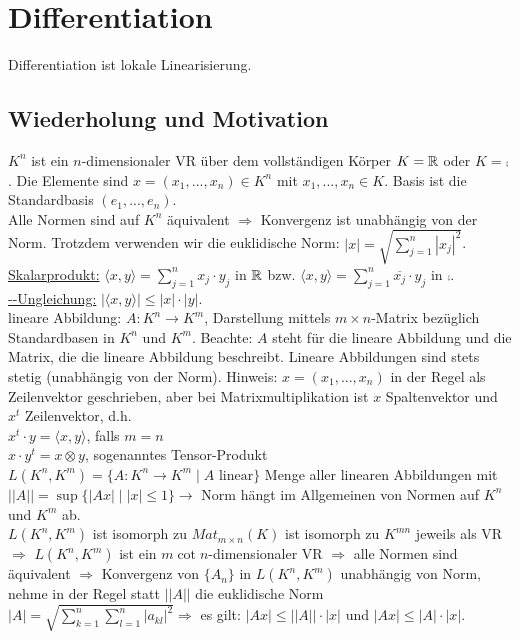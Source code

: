 \setcounter{dummy}{16}
\addtocounter{section}{15}
\addtocounter{chapter}{4}

\chapter{Differentiation}
	Differentiation ist lokale Linearisierung.

\section{Wiederholung und Motivation}
	\begin{ueberblick}
	$K^n$ ist ein $n$-dimensionaler VR über dem vollständigen Körper $K=\mathbb{R}$ 
	oder $K=\comp$. Die Elemente sind $x=(x_1,...,x_n)\in K^n$ mit 
	$x_1,...,x_n\in K$. Basis ist die Standardbasis $(e_1,...,e_n)$. \\
	
	
	Alle Normen sind auf $K^n$ äquivalent $\Rightarrow$ Konvergenz ist 
	unabhängig von der Norm. Trotzdem verwenden wir die euklidische Norm: 
	$|x|=\sqrt{\sum\limits_{j=1}^n |x_j|^2}$. \\
	
	
	\underline{Skalarprodukt:} $\langle x,y \rangle=\sum\limits_{j=1}^n x_j\cdot y_j$ in 
	$\mathbb{R}$ bzw. $\langle x,y \rangle=\sum\limits_{j=1}^n \overline{x_j}
	\cdot y_j$ in $\comp$. \\
	
	
	\underline{--Ungleichung:} $|\langle x,y \rangle| \le
	|x|\cdot |y|$. \\

	
	lineare Abbildung: $A:K^n \to K^m$, Darstellung mittels $m\times n$-Matrix 
	bezüglich Standardbasen in $K^n$ und $K^m$. Beachte: $A$ steht für die 
	lineare Abbildung und die Matrix, die die lineare Abbildung beschreibt. 
	Lineare Abbildungen sind stets stetig (unabhängig von der Norm). Hinweis: 
	$x=(x_1,...,x_n)$ in der Regel als Zeilenvektor geschrieben, aber bei 
	Matrixmultiplikation ist $x$ Spaltenvektor und $x^t$ Zeilenvektor, d.h. \\
	$x^t\cdot y=\langle x,y \rangle$, falls $m=n$ \\
	$x\cdot y^t=x\otimes y$, sogenanntes Tensor-Produkt \\
	
	
	$L(K^n,K^m)=\{A: K^n \to K^m \mid A \text{ linear}\}$ Menge aller 
	linearen Abbildungen mit $||A||=\sup\{|Ax| \mid |x|\le 1\} \to$ Norm 
	hängt im Allgemeinen von Normen auf $K^n$ und $K^m$ ab. \\
	$L(K^n,K^m)$ ist isomorph zu $Mat_{m\times n}(K)$ ist isomorph zu $K^{mn}$ 
	jeweils als VR $\Rightarrow$ $L(K^n,K^m)$ ist ein $m\cot n$-dimensionaler 
	VR $\Rightarrow$ alle Normen sind äquivalent $\Rightarrow$ Konvergenz von 
	$\{A_n\}$ in $L(K^n,K^m)$ unabhängig von Norm, nehme in der Regel statt 
	$||A||$ die euklidische Norm $|A|=\sqrt{\sum\limits_{k=1}^n \sum\limits_
	{l=1}^n |a_{kl}|^2} \Rightarrow$ es gilt: $|Ax|\le ||A||\cdot |x|$ und 
	$|Ax|\le |A|\cdot |x|$. \\
	

\end{ueberblick}

